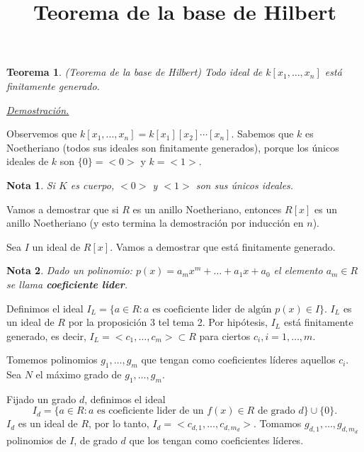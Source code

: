 \documentclass{article}
\newtheorem{teor}{Teorema}
\newtheorem{nota}{Nota}
\begin{document}
\title{Teorema de la base de Hilbert}
\maketitle

\large

\begin{teor}
(Teorema de la base de Hilbert) Todo ideal de $k[x_1,\dots,x_n]$ está finitamente generado. 
\end{teor}

\underline{\textit{Demostración.}}
\vspace{2mm}

Observemos que $k[x_1,\dots,x_n]=k[x_1][x_2]\cdots [x_n]$. Sabemos que $k$ es Noetheriano (todos sus ideales son finitamente generados), porque los únicos ideales de $k$ son $\{ 0 \} = <0>$ y $k=<1> $.

\begin{nota}
Si $K$ es cuerpo, $<0>$ y $<1>$ son sus únicos ideales. 
\end{nota}

Vamos a demostrar que si $R$ es un anillo Noetheriano, entonces $R[x]$ es un anillo Noetheriano (y esto termina la demostración por inducción en $n$).

Sea $I$ un ideal de $R[x]$. Vamos a demostrar que está finitamente generado.

\begin{nota}
Dado un polinomio: $p(x)=a_mx^m+\dots + a_1x+a_0$ el elemento $a_m\in R$ se llama \textbf{coeficiente lider}.
\end{nota}

Definimos el ideal $I_L=\{ a \in R : a \text{ es coeficiente lider de algún } p(x)\in I\}$. $I_L$ es un ideal de $R$ por la proposición 3 tel tema 2. Por hipótesis, $I_L$ está finitamente generado, es decir,  $I_L=<c_1,\dots , c_m>\subset R$ para ciertos $c_i,i=1,\dots , m$.

\vspace{2mm}
Tomemos polinomios $g_1,\dots, g_m$ que tengan como coeficientes líderes aquellos $c_i$. Sea $N$ el máximo grado de $g_1,\dots, g_m$.

\vspace{2mm}
Fijado un grado $d$, definimos el ideal
$$I_d=\{a\in R : a \text{ es coeficiente lider de un }f(x)\in R \text{ de grado } d \}\cup \{0\}.$$
$I_d$ es un ideal de $R$, por lo tanto, $I_d=<c_{d,1},\dots , c_{d,m_d}>$. Tomamos $g_{d,1},\dots , g_{d,m_d}$ polinomios de $I$, de grado $d$ que los tengan como coeficientes líderes.
\vspace{2mm}
\end{document}
